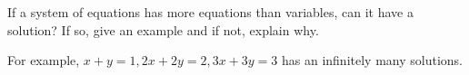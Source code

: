 
\begin{Exercise}[
name={},
title={}, 
difficulty=0,
origin={\cite{KK}}]
If a system of equations has more equations than variables, can it
have a solution? If so, give an example and if not, explain why.
\end{Exercise}

\begin{Answer}
For example, $x+y=1,2x+2y=2,3x+3y=3$ has an infinitely many solutions.
\end{Answer}
